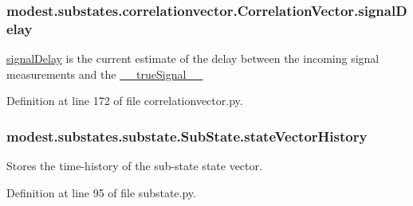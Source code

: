\subsubsection[{\texorpdfstring{signal\+Delay}{signalDelay}}]{\setlength{\rightskip}{0pt plus 5cm}modest.\+substates.\+correlationvector.\+Correlation\+Vector.\+signal\+Delay}\hypertarget{classmodest_1_1substates_1_1correlationvector_1_1CorrelationVector_aa1565b9972d60149f335e3b923cac371}{}\label{classmodest_1_1substates_1_1correlationvector_1_1CorrelationVector_aa1565b9972d60149f335e3b923cac371}


\hyperlink{classmodest_1_1substates_1_1correlationvector_1_1CorrelationVector_aa1565b9972d60149f335e3b923cac371}{signal\+Delay} is the current estimate of the delay between the incoming signal measurements and the \hyperlink{classmodest_1_1substates_1_1correlationvector_1_1CorrelationVector_af2f52cea1c695f36dd100f529c322e94}{\+\_\+\+\_\+true\+Signal\+\_\+\+\_\+} 



Definition at line 172 of file correlationvector.\+py.

\subsubsection[{\texorpdfstring{state\+Vector\+History}{stateVectorHistory}}]{\setlength{\rightskip}{0pt plus 5cm}modest.\+substates.\+substate.\+Sub\+State.\+state\+Vector\+History\hspace{0.3cm}{\ttfamily [inherited]}}\hypertarget{classmodest_1_1substates_1_1substate_1_1SubState_a38c12c9d0899bc1161f3502b584517a2}{}\label{classmodest_1_1substates_1_1substate_1_1SubState_a38c12c9d0899bc1161f3502b584517a2}


Stores the time-\/history of the sub-\/state state vector. 



Definition at line 95 of file substate.\+py.

